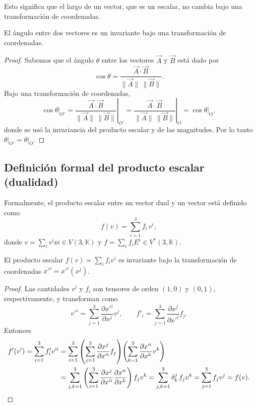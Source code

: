 Esto significa que el largo de un vector, que es un escalar, no cambia bajo una transformación de coordenadas.

\begin{corolario}
El ángulo entre dos vectores es un invariante bajo una transformación de coordenadas.
\end{corolario}

\begin{proof}
Sabemos que el ángulo $\theta$ entre los vectores $\vec A$ y $\vec B$ está dado por
\begin{equation}
\cos\theta = \frac{\vec A\cdot\vec B}{\|\vec A\|\,\|\vec B\|} .
\end{equation}
Bajo una transformación de coordenadas,
\begin{equation}
\cos\theta\Big|_{O'} = \left.\frac{\vec A\cdot\vec B}{\|\vec A\|\,\|\vec B\|}\right|_{O'}
= \left.\frac{\vec A\cdot\vec B}{\|\vec A\|\,\|\vec B\|}\right|_{O} = \cos\theta\Big|_O ,
\end{equation}
donde se usó la invariancia del producto escalar y de las magnitudes. Por lo tanto $\theta\big|_{O'}=\theta\big|_O$.
\end{proof}

\subsection{Definición formal del producto escalar (dualidad)}

Formalmente, el producto escalar entre un vector dual y un vector está definido como
\begin{equation}
f(v) = \sum_{i=1}^3 f_i\, v^i ,
\end{equation}
donde $v=\sum_i v^i\ee{i}\in V(3,\mathbb{K})$ y $f=\sum_i f_i E^i \in V^*(3,\mathbb{K})$.

\begin{proposicion}
El producto escalar $f(v)=\sum_i f_iv^i$ es invariante bajo la transformación de coordenadas $x'^i=x'^i(x^j)$.
\end{proposicion}

\begin{proof}
Las cantidades $v^i$ y $f_i$ son tensores de orden $(1,0)$ y $(0,1)$, respectivamente, y transforman como
\begin{equation}
v'^i = \sum_{j=1}^3 \frac{\partial x'^i}{\partial x^j}v^j, \qquad
f'_i = \sum_{j=1}^3 \frac{\partial x^j}{\partial x'^i}f_j .
\end{equation}
Entonces
\begin{align}
f'(v') = \sum_{i=1}^3 f'_i v'^i
&= \sum_{i=1}^3\left(\sum_{j=1}^3\frac{\partial x^j}{\partial x'^i}f_j\right)\!\left(\sum_{k=1}^3\frac{\partial x'^i}{\partial x^k}v^k\right) \notag \\
&= \sum_{j,k=1}^3\left(\sum_{i=1}^3\frac{\partial x^j}{\partial x'^i}\frac{\partial x'^i}{\partial x^k}\right)f_jv^k
= \sum_{j,k=1}^3 \delta^j_k\, f_j v^k = \sum_{j=1}^3 f_jv^j = f(v) .
\end{align}
\end{proof}

